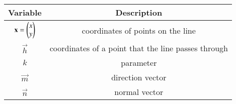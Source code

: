 \begin{tabular}[12pt]{ |c| c|}
    \hline
        \textbf{Variable}  & \textbf{Description}\\
    \hline
        $\mathbf{x}=\begin{pmatrix}x\\y\end{pmatrix}$ &  coordinates of points on the line\\
    \hline 
        $\vec{h}$ & coordinates of a point that the line passes through\\
    \hline
	$k$ & parameter\\
    \hline
	$\vec{m}$ & direction vector\\
    \hline
	$\vec{n}$ & normal vector\\
    \hline 
\end{tabular}
